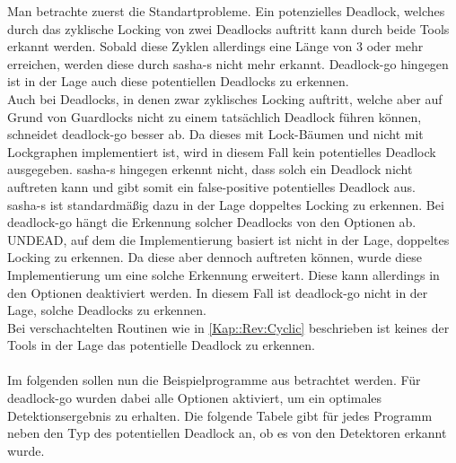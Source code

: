 Man betrachte zuerst die Standartprobleme. Ein potenzielles Deadlock, welches 
durch das zyklische Locking von zwei Deadlocks auftritt kann durch beide Tools
erkannt werden. Sobald diese Zyklen allerdings eine Länge von 3 oder mehr 
erreichen, werden diese durch sasha-s nicht mehr erkannt. Deadlock-go 
hingegen ist in der Lage auch diese potentiellen Deadlocks zu erkennen.\\
Auch bei Deadlocks, in denen zwar zyklisches Locking auftritt, welche aber 
auf Grund von Guardlocks nicht zu einem tatsächlich Deadlock führen können,
schneidet deadlock-go besser ab. Da dieses mit Lock-Bäumen und nicht mit 
Lockgraphen implementiert ist, wird in diesem Fall kein potentielles Deadlock 
ausgegeben. sasha-s hingegen erkennt nicht, dass solch ein Deadlock nicht 
auftreten kann und gibt somit ein false-positive potentielles Deadlock aus.\\ 
sasha-s ist standardmäßig dazu in  der Lage doppeltes Locking zu erkennen.
Bei deadlock-go hängt die Erkennung solcher Deadlocks von den Optionen ab.
UNDEAD, auf dem die Implementierung basiert ist nicht in der Lage, doppeltes 
Locking zu erkennen. Da diese aber dennoch auftreten können, wurde diese 
Implementierung um eine solche Erkennung erweitert. Diese kann allerdings 
in den Optionen deaktiviert werden. In diesem Fall ist deadlock-go nicht in 
der Lage, solche Deadlocks zu erkennen. \\ 
Bei verschachtelten Routinen wie in \ref{Kap::Rev:Cyclic} beschrieben ist 
keines der Tools in der Lage das potentielle Deadlock zu erkennen.\\\\ 
Im folgenden sollen nun die Beispielprogramme aus \cite{implementation} 
betrachtet werden. Für deadlock-go wurden dabei alle Optionen aktiviert, um ein 
optimales Detektionsergebnis zu erhalten.
Die folgende Tabele gibt für jedes Programm neben den
Typ des potentiellen Deadlock an, ob es von den Detektoren erkannt wurde. 
